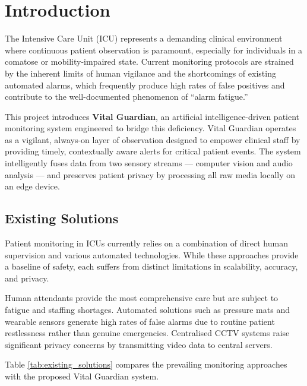 \chapter{Introduction}
\label{chap:intro}

The Intensive Care Unit (ICU) represents a demanding clinical environment where
continuous patient observation is paramount, especially for individuals in a
comatose or mobility-impaired state. Current monitoring protocols are strained
by the inherent limits of human vigilance and the shortcomings of existing
automated alarms, which frequently produce high rates of false positives and
contribute to the well-documented phenomenon of ``alarm fatigue.''

This project introduces \textbf{Vital Guardian}, an artificial intelligence-driven
patient monitoring system engineered to bridge this deficiency. Vital Guardian
operates as a vigilant, always-on layer of observation designed to empower
clinical staff by providing timely, contextually aware alerts for critical patient
events. The system intelligently fuses data from two sensory streams --- computer
vision and audio analysis --- and preserves patient privacy by processing all raw
media locally on an edge device.

\section{Existing Solutions}
\label{sec:existing_solutions}

Patient monitoring in ICUs currently relies on a combination of direct human
supervision and various automated technologies. While these approaches provide a
baseline of safety, each suffers from distinct limitations in scalability,
accuracy, and privacy.

Human attendants provide the most comprehensive care but are subject to fatigue
and staffing shortages. Automated solutions such as pressure mats and wearable
sensors generate high rates of false alarms due to routine patient restlessness
rather than genuine emergencies. Centralised CCTV systems raise significant
privacy concerns by transmitting video data to central servers.

Table \ref{tab:existing_solutions} compares the prevailing monitoring approaches
with the proposed Vital Guardian system.

